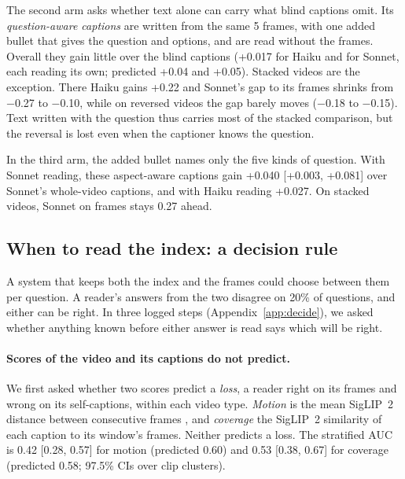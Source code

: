 \documentclass[11pt]{article}
\begin{document}
The second arm asks whether text alone can carry what blind captions omit. Its \emph{question-aware captions} are written from the same 5 frames, with one added bullet that gives the question and options, and are read without the frames. Overall they gain little over the blind captions (+0.017 for Haiku and for Sonnet, each reading its own; predicted +0.04 and +0.05). Stacked videos are the exception. There Haiku gains +0.22 and Sonnet's gap to its frames shrinks from −0.27 to −0.10, while on reversed videos the gap barely moves (−0.18 to −0.15). Text written with the question thus carries most of the stacked comparison, but the reversal is lost even when the captioner knows the question.

In the third arm, the added bullet names only the five kinds of question. With Sonnet reading, these aspect-aware captions gain +0.040 [+0.003, +0.081] over Sonnet's whole-video captions, and with Haiku reading +0.027. On stacked videos, Sonnet on frames stays 0.27 ahead.

\subsection{When to read the index: a decision rule}
\label{sec:decide}

A system that keeps both the index and the frames could choose between them per question. A reader's answers from the two disagree on 20\% of questions, and either can be right. In three logged steps (Appendix~\ref{app:decide}), we asked whether anything known before either answer is read says which will be right.

\paragraph{Scores of the video and its captions do not predict.} We first asked whether two scores predict a \emph{loss}, a reader right on its frames and wrong on its self-captions, within each video type. \emph{Motion} is the mean SigLIP~2 distance between consecutive frames \citep{siglip2}, and \emph{coverage} the SigLIP~2 similarity of each caption to its window's frames. Neither predicts a loss. The stratified AUC is 0.42 [0.28, 0.57] for motion (predicted 0.60) and 0.53 [0.38, 0.67] for coverage (predicted 0.58; 97.5\% CIs over clip clusters).
\end{document}
